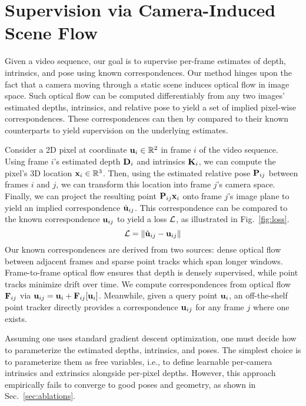 
\section{Supervision via Camera-Induced Scene Flow}
\label{sec:loss}
Given a video sequence, our goal is to supervise per-frame estimates of depth, intrinsics, and pose using known correspondences.
Our method hinges upon the fact that a camera moving through a static scene induces optical flow in image space.
Such optical flow can be computed differentiably from any two images' estimated depths, intrinsics, and relative pose to yield a set of implied pixel-wise correspondences.
These correspondences can then by compared to their known counterparts to yield supervision on the underlying estimates.

Consider a 2D pixel at coordinate $\mathbf{u}_i \in \mathbb{R}^2$ in frame $i$ of the video sequence. 
Using frame $i$'s estimated depth $\mathbf{D}_i$ and intrinsics $\mathbf{K}_i$, we can compute the pixel's 3D location $\mathbf{x}_i \in \mathbb{R}^3$.
Then, using the estimated relative pose $\textbf{P}_{ij}$ between frames $i$ and $j$, we can transform this location into frame $j$'s camera space.
Finally, we can project the resulting point $\textbf{P}_{ij} \mathbf{x}_i$ onto frame $j$'s image plane to yield an implied correspondence $\hat{\mathbf{u}}_{ij}$.
This correspondence can be compared to the known correspondence $\mathbf{u}_{ij}$ to yield a loss $\mathcal{L}$, as illustrated in Fig.~\ref{fig:loss}.
\begin{equation}
    \mathcal{L} = \| \hat{\mathbf{u}}_{ij} - \mathbf{u}_{ij} \|
    \label{eq:loss}
\end{equation}
\vspace{-25pt}
Our known correspondences are derived from two sources: dense optical flow between adjacent frames and sparse point tracks which span longer windows.
Frame-to-frame optical flow ensures that depth is densely supervised, while point tracks minimize drift over time.
We compute correspondences from optical flow $\mathbf{F}_{ij}$ via $\mathbf{u}_{ij} = \mathbf{u}_i + \mathbf{F}_{ij}[\mathbf{u}_i]$.
Meanwhile, given a query point $\mathbf{u}_i$, an off-the-shelf point tracker directly provides a correspondence $\mathbf{u}_{ij}$ for any frame $j$ where one exists.


Assuming one uses standard gradient descent optimization, one must decide how to parameterize the estimated depths, intrinsics, and poses.
The simplest choice is to parameterize them as free variables, i.e., to define learnable per-camera intrinsics and extrinsics alongside per-pixel depths.
However, this approach empirically fails to converge to good poses and geometry, as shown in Sec.~\ref{sec:ablations}.


